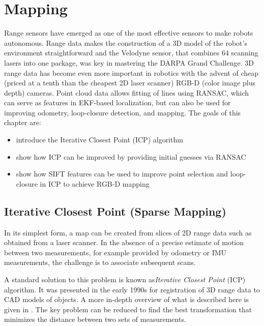 \chapter{Mapping}
 Range sensors have emerged as one of the most effective sensors to make robots autonomous. Range data makes the construction of a 3D model of the robot's environment straightforward and the Velodyne sensor, that combines 64 scanning lasers into one package, was key in mastering the DARPA Grand Challenge.  3D range data has become even more important in robotics with the advent of cheap (priced at a tenth than the cheapest 2D laser scanner) RGB-D (color image plus depth) cameras. Point cloud data allows fitting of lines using RANSAC, which can serve as features in EKF-based localization, but can also be used for improving odometry, loop-closure detection, and mapping. The goals of this chapter are:

\begin{itemize}
    \item introduce the Iterative Closest Point (ICP) algorithm
    \item show how ICP can be improved by providing initial guesses via RANSAC
    \item show how SIFT features can be used to improve point selection and loop-closure in ICP to achieve RGB-D mapping
\end{itemize}



\section{Iterative Closest Point (Sparse Mapping)}
In its simplest form, a map can be created from slices of 2D range data such as obtained from a laser scanner. In the absence of a precise estimate of motion between two measurements, for example provided by odometry or IMU measurements, the challenge is to associate subsequent scans. 

A standard solution to this problem is known as\emph{Iterative Closest Point} (ICP) algorithm. It was presented in the early 1990s for registration of 3D range data to CAD models of objects. A more in-depth overview of what is described here is given in \cite{rusinkiewicz01}. The key problem can be reduced to find the best transformation that minimizes the distance between two sets of measurements.

